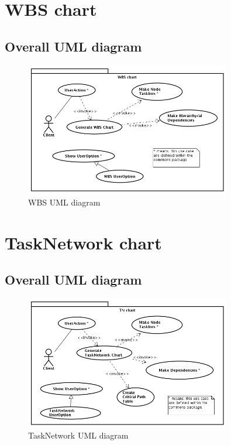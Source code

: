 \chapter{WBS chart}
\section*{Overall UML diagram}
\begin{figure}[h!] \centering
\includegraphics[width=0.8\textwidth]{../Milestone2-UseCases/WBS/WBSChart.png}
\caption{WBS UML diagram}
\label{fig:WBSdiagram}
\end{figure}




\chapter{TaskNetwork chart}
\section*{Overall UML diagram}
\begin{figure}[h!] \centering
\includegraphics[width=0.8\textwidth]{../Milestone2-UseCases/TaskNetwork/img/TNChart.png}
\caption{TaskNetwork UML diagram}
\label{fig:TNdiagram}
\end{figure}


